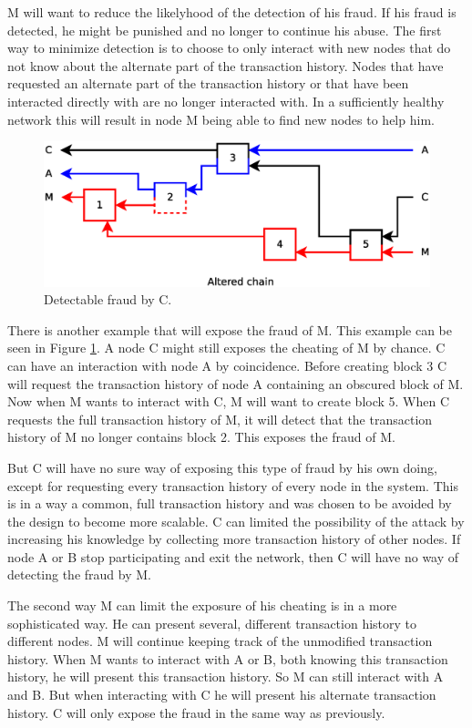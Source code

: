 M will want to reduce the likelyhood of the detection of his fraud.
If his fraud is detected, he might be punished and no longer to continue his abuse.
The first way to minimize detection is to choose
to only interact with new nodes that do not know about the alternate part of the transaction history.
Nodes that have requested an alternate part of the transaction history
or that have been interacted directly with are no longer interacted with.
In a sufficiently healthy network this will result in node M being able to find new nodes to help him.

\begin{figure}
	\centerline{\includegraphics[scale=0.3]{problems/figs/branch-fraud-detected.eps}}
	\caption{Detectable fraud by C.}
	\label{fig:problem-branch-preknowledge}
\end{figure}

There is another example that will expose the fraud of M.
This example can be seen in Figure \ref{fig:problem-branch-preknowledge}.
A node C might still exposes the cheating of M by chance.
C can have an interaction with node A by coincidence.
Before creating block 3 C will request the transaction history of node A containing an obscured block of M.
Now when M wants to interact with C, M will want to create block 5.
When C requests the full transaction history of M, it will detect that the transaction history of M no longer contains block 2.
This exposes the fraud of M.

But C will have no sure way of exposing this type of fraud by his own doing,
except for requesting every transaction history of every node in the system.
This is in a way a common, full transaction history and was chosen to be avoided by the design to become more scalable.
C can limited the possibility of the attack by increasing his knowledge by collecting more transaction history of other nodes.
If node A or B stop participating and exit the network,
then C will have no way of detecting the fraud by M.

The second way M can limit the exposure of his cheating is in a more sophisticated way.
He can present several, different transaction history to different nodes.
M will continue keeping track of the unmodified transaction history.
When M wants to interact with A or B, both knowing this transaction history, he will present this transaction history.
So M can still interact with A and B.
But when interacting with C he will present his alternate transaction history.
C will only expose the fraud in the same way as previously.

